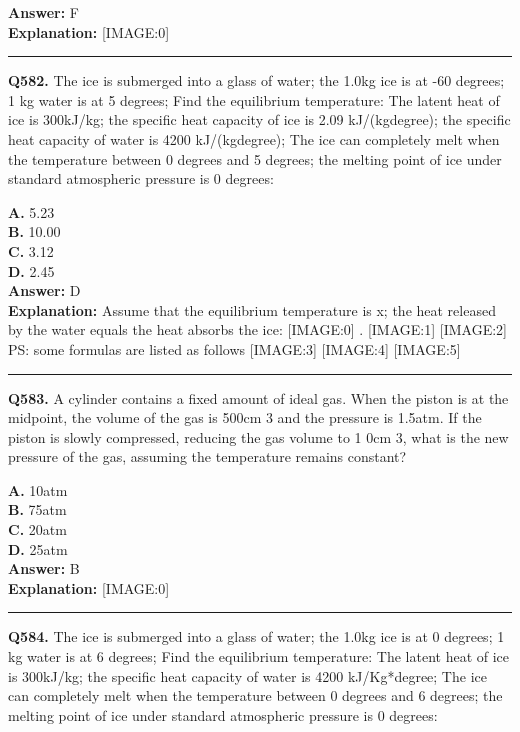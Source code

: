 \documentclass[12pt]{article}
\begin{document}
\textbf{Answer:} F \\
\textbf{Explanation:} [IMAGE:0]

\hrule
\vspace{1em}


\noindent
\textbf{Q582.} The ice is submerged into a glass of water; the 1.0kg ice is at -60 degrees; 1 kg water is at 5 degrees; Find the equilibrium temperature: The latent heat of ice is 300kJ/kg; the specific heat capacity of ice is 2.09 kJ/(kg\cdot degree); the specific heat capacity of water is 4200 kJ/(kg\cdot degree); The ice can completely melt when the temperature between 0 degrees and 5 degrees; the melting point of ice under standard atmospheric pressure is 0 degrees:



\textbf{A.} 5.23 \\
\textbf{B.} 10.00 \\
\textbf{C.} 3.12 \\
\textbf{D.} 2.45 \\

\textbf{Answer:} D \\
\textbf{Explanation:} Assume that the equilibrium temperature is x; the heat released by the water equals the heat absorbs the ice:
[IMAGE:0]
.
[IMAGE:1]
[IMAGE:2]
PS: some formulas are listed as follows
[IMAGE:3]
[IMAGE:4]
[IMAGE:5]

\hrule
\vspace{1em}


\noindent
\textbf{Q583.} A cylinder contains a fixed amount of ideal gas. When the piston is at the midpoint, the volume of the gas is 500cm
3
and the pressure is 1.5atm. If the piston is slowly compressed, reducing the gas volume to
1
0cm
3,
what is the new pressure of the gas, assuming the temperature remains constant?



\textbf{A.} 10atm \\
\textbf{B.} 75atm \\
\textbf{C.} 20atm \\
\textbf{D.} 25atm \\

\textbf{Answer:} B \\
\textbf{Explanation:} [IMAGE:0]

\hrule
\vspace{1em}


\noindent
\textbf{Q584.} The ice is submerged into a glass of water; the 1.0kg ice is at 0 degrees; 1 kg water is at 6 degrees; Find the equilibrium temperature: The latent heat of ice is 300kJ/kg; the specific heat capacity of water is 4200 kJ/Kg*degree; The ice can completely melt when the temperature between 0 degrees and 6 degrees; the melting point of ice under standard atmospheric pressure is 0 degrees:
\end{document}
